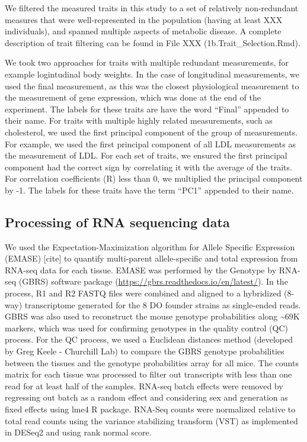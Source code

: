 \documentclass[
]{article}
\begin{document}
We filtered the measured traits in this study to a set of relatively
non-redundant measures that were well-represented in the population
(having at least XXX individuals), and spanned multiple aspects of
metabolic disease. A complete description of trait filtering can be
found in File XXX (1b.Trait\_Selection.Rmd).

We took two approaches for traits with multiple redundant measurements,
for example logintudinal body weights. In the case of longitudinal
measurements, we used the final measurement, as this was the closest
physiological measurement to the measurement of gene expression, which
was done at the end of the experiment. The labels for these traits are
have the word ``Final'' appended to their name. For traits with multiple
highly related measurements, such as cholesterol, we used the first
principal component of the group of measurements. For example, we used
the first principal component of all LDL measurements as the measurement
of LDL. For each set of traits, we ensured the first principal component
had the correct sign by correlating it with the average of the traits.
For correlation coefficients (R) less than 0, we multiplied the
principal component by -1. The labels for these traits have the term
``PC1'' appended to their name.

\subsection{Processing of RNA sequencing
data}\label{processing-of-rna-sequencing-data}

We used the Expectation-Maximization algorithm for Allele Specific
Expression (EMASE) {[}cite{]} to quantify multi-parent allele-specific
and total expression from RNA-seq data for each tissue. EMASE was
performed by the Genotype by RNA-seq (GBRS) software package
(\url{https://gbrs.readthedocs.io/en/latest/}). In the process, R1 and
R2 FASTQ files were combined and aligned to a hybridized (8-way)
transcriptome generated for the 8 DO founder strains as single-ended
reads. GBRS was also used to reconstruct the mouse genotype
probabilities along \textasciitilde69K markers, which was used for
confirming genotypes in the quality control (QC) process. For the QC
process, we used a Euclidean distances method (developed by Greg Keele -
Churchill Lab) to compare the GBRS genotype probabilities between the
tissues and the genotype probabilities array for all mice. The counts
matrix for each tissue was processed to filter out transcripts with less
than one read for at least half of the samples. RNA-seq batch effects
were removed by regressing out batch as a random effect and considering
sex and generation as fixed effects using lme4 R package. RNA-Seq counts
were normalized relative to total read counts using the variance
stabilizing transform (VST) as implemented in DESeq2 and using rank
normal score.
\end{document}
